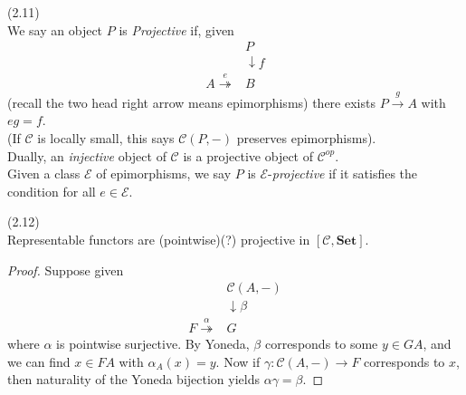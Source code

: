 \documentclass[a4paper]{article}
\begin{document}
\begin{defi} (2.11)\\
    We say an object $P$ is \emph{Projective} if, given 
    \begin{equation*}
        \begin{aligned}
            &P\\
            &\downarrow f\\
            A\stackrel{e}{\twoheadrightarrow}&B
        \end{aligned}
    \end{equation*}
    (recall the two head right arrow means epimorphisms) there exists $P \xrightarrow{g} A$ with $eg = f$.\\
    (If $\mathcal{C}$ is locally small, this says $\mathcal{C}(P,-)$ preserves epimorphisms).\\
    Dually, an \emph{injective} object of $\mathcal{C}$ is a projective object of $\mathcal{C}^{op}$.\\
    Given a class $\mathcal{E}$ of epimorphisms, we say $P$ is $\mathcal{E}$-\emph{projective} if it satisfies the condition for all $e \in \mathcal{E}$.
\end{defi}

\begin{lemma} (2.12)\\
    Representable functors are (pointwise)(?) projective in $[\mathcal{C},\mathbf{Set}]$.
    \begin{proof}
        Suppose given 
        \begin{equation*}
            \begin{aligned}
                &\mathcal{C}(A,-)\\
                &\downarrow \beta\\
                F\stackrel{\alpha}{\twoheadrightarrow}&G
            \end{aligned}
        \end{equation*}
        where $\alpha$ is pointwise surjective. By Yoneda, $\beta$ corresponds to some $y \in GA$, and we can find $x \in FA$ with $\alpha_A(x) = y$. Now if $\gamma:\mathcal{C}(A,-) \to F$ corresponds to $x$, then naturality of the Yoneda bijection yields $\alpha\gamma =\beta$.
    \end{proof}
\end{lemma}
\end{document}
